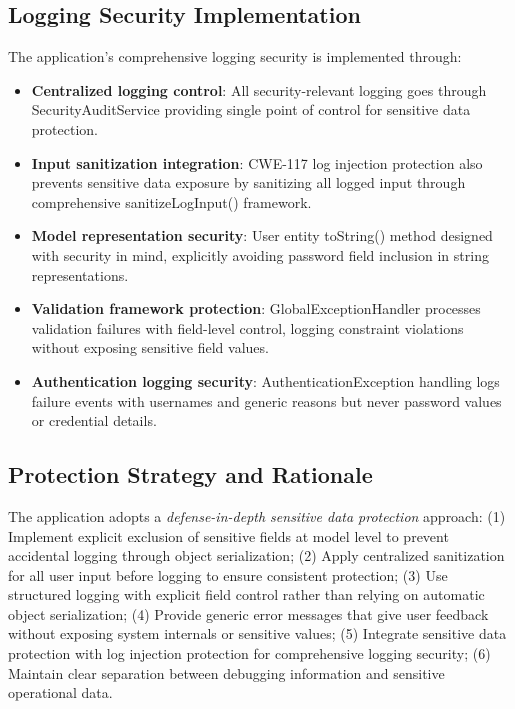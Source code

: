 \documentclass[]{UCD_CS_FYP_Report}
\begin{document}
\subsection{Logging Security Implementation}
The application's comprehensive logging security is implemented through:
\begin{itemize}
	\item \textbf{Centralized logging control}: All security-relevant logging goes through SecurityAuditService providing single point of control for sensitive data protection.
	\item \textbf{Input sanitization integration}: CWE-117 log injection protection also prevents sensitive data exposure by sanitizing all logged input through comprehensive sanitizeLogInput() framework.
	\item \textbf{Model representation security}: User entity toString() method designed with security in mind, explicitly avoiding password field inclusion in string representations.
	\item \textbf{Validation framework protection}: GlobalExceptionHandler processes validation failures with field-level control, logging constraint violations without exposing sensitive field values.
	\item \textbf{Authentication logging security}: AuthenticationException handling logs failure events with usernames and generic reasons but never password values or credential details.
\end{itemize}

\subsection{Protection Strategy and Rationale}
The application adopts a \textit{defense-in-depth sensitive data protection} approach: (1) Implement explicit exclusion of sensitive fields at model level to prevent accidental logging through object serialization; (2) Apply centralized sanitization for all user input before logging to ensure consistent protection; (3) Use structured logging with explicit field control rather than relying on automatic object serialization; (4) Provide generic error messages that give user feedback without exposing system internals or sensitive values; (5) Integrate sensitive data protection with log injection protection for comprehensive logging security; (6) Maintain clear separation between debugging information and sensitive operational data.
\end{document}
